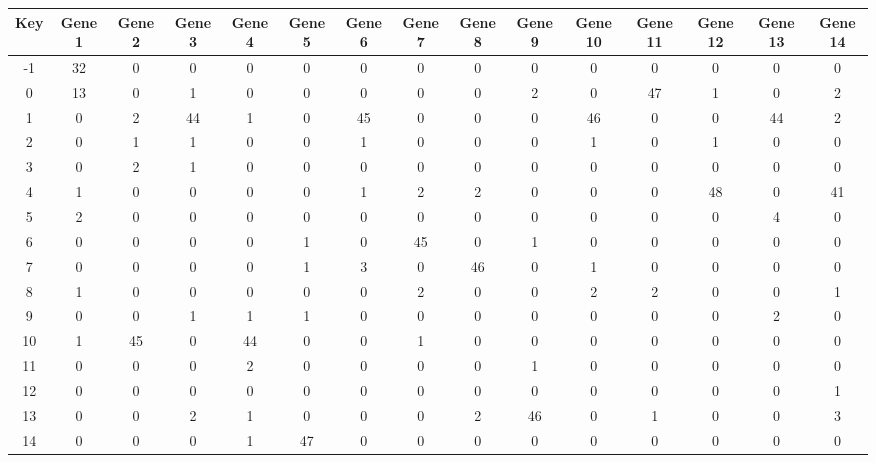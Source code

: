 \begin{tabular}{|c|c|c|c|c|c|c|c|c|c|c|c|c|c|c|}
\hline
Key & Gene 1 & Gene 2 & Gene 3 & Gene 4 & Gene 5 & Gene 6 & Gene 7 & Gene 8 & Gene 9 & Gene 10 & Gene 11 & Gene 12 & Gene 13 & Gene 14 \\
\hline
-1 & 32 & 0 & 0 & 0 & 0 & 0 & 0 & 0 & 0 & 0 & 0 & 0 & 0 & 0 \\
0 & 13 & 0 & 1 & 0 & 0 & 0 & 0 & 0 & 2 & 0 & 47 & 1 & 0 & 2 \\
1 & 0 & 2 & 44 & 1 & 0 & 45 & 0 & 0 & 0 & 46 & 0 & 0 & 44 & 2 \\
2 & 0 & 1 & 1 & 0 & 0 & 1 & 0 & 0 & 0 & 1 & 0 & 1 & 0 & 0 \\
3 & 0 & 2 & 1 & 0 & 0 & 0 & 0 & 0 & 0 & 0 & 0 & 0 & 0 & 0 \\
4 & 1 & 0 & 0 & 0 & 0 & 1 & 2 & 2 & 0 & 0 & 0 & 48 & 0 & 41 \\
5 & 2 & 0 & 0 & 0 & 0 & 0 & 0 & 0 & 0 & 0 & 0 & 0 & 4 & 0 \\
6 & 0 & 0 & 0 & 0 & 1 & 0 & 45 & 0 & 1 & 0 & 0 & 0 & 0 & 0 \\
7 & 0 & 0 & 0 & 0 & 1 & 3 & 0 & 46 & 0 & 1 & 0 & 0 & 0 & 0 \\
8 & 1 & 0 & 0 & 0 & 0 & 0 & 2 & 0 & 0 & 2 & 2 & 0 & 0 & 1 \\
9 & 0 & 0 & 1 & 1 & 1 & 0 & 0 & 0 & 0 & 0 & 0 & 0 & 2 & 0 \\
10 & 1 & 45 & 0 & 44 & 0 & 0 & 1 & 0 & 0 & 0 & 0 & 0 & 0 & 0 \\
11 & 0 & 0 & 0 & 2 & 0 & 0 & 0 & 0 & 1 & 0 & 0 & 0 & 0 & 0 \\
12 & 0 & 0 & 0 & 0 & 0 & 0 & 0 & 0 & 0 & 0 & 0 & 0 & 0 & 1 \\
13 & 0 & 0 & 2 & 1 & 0 & 0 & 0 & 2 & 46 & 0 & 1 & 0 & 0 & 3 \\
14 & 0 & 0 & 0 & 1 & 47 & 0 & 0 & 0 & 0 & 0 & 0 & 0 & 0 & 0 \\
\hline
\end{tabular}